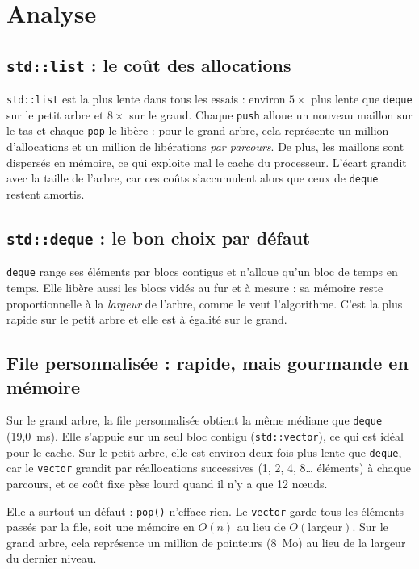 \documentclass[11pt,a4paper]{article}
\begin{document}
\section{Analyse}

\subsection{\texttt{std::list} : le coût des allocations}

\texttt{std::list} est la plus lente dans tous les essais : environ $5\times$ plus lente
que \texttt{deque} sur le petit arbre et $8\times$ sur le grand. Chaque \texttt{push} alloue un
nouveau maillon sur le tas et chaque \texttt{pop} le libère : pour le grand arbre, cela représente
un million d'allocations et un million de libérations \emph{par parcours}. De plus, les maillons
sont dispersés en mémoire, ce qui exploite mal le cache du processeur. L'écart grandit avec la taille de
l'arbre, car ces coûts s'accumulent alors que ceux de \texttt{deque} restent amortis.

\subsection{\texttt{std::deque} : le bon choix par défaut}

\texttt{deque} range ses éléments par blocs contigus et n'alloue qu'un bloc de temps en temps.
Elle libère aussi les blocs vidés au fur et à mesure : sa mémoire reste proportionnelle à la
\emph{largeur} de l'arbre, comme le veut l'algorithme. C'est la plus rapide sur le petit arbre
et elle est à égalité sur le grand.

\subsection{File personnalisée : rapide, mais gourmande en mémoire}

Sur le grand arbre, la file personnalisée obtient la même médiane que \texttt{deque} (19,0~ms). Elle
s'appuie sur un seul bloc contigu (\texttt{std::vector}), ce qui est idéal pour le cache. Sur le
petit arbre, elle est environ deux fois plus lente que \texttt{deque}, car le \texttt{vector}
grandit par réallocations successives (1, 2, 4, 8\dots{} éléments) à chaque parcours, et ce coût
fixe pèse lourd quand il n'y a que 12 nœuds.

Elle a surtout un défaut : \texttt{pop()} n'efface rien. Le \texttt{vector} garde tous les
éléments passés par la file, soit une mémoire en $O(n)$ au lieu de $O(\text{largeur})$. Sur le
grand arbre, cela représente un million de pointeurs (8~Mo) au lieu de la largeur du dernier niveau.
\end{document}
